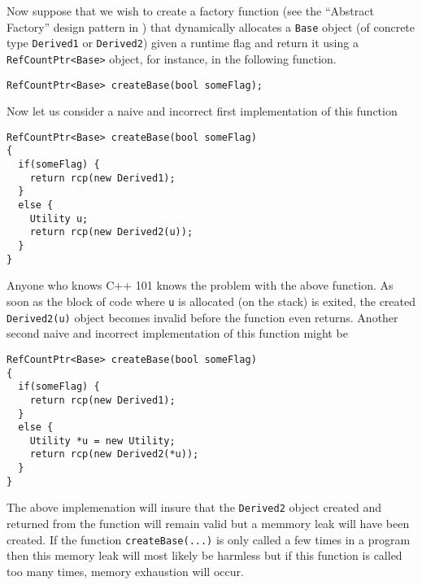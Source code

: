 Now suppose that we wish to create a factory function (see the
``Abstract Factory'' design pattern in {}\cite{ref:gama_et_al_1995})
that dynamically allocates a {}\texttt{Base} object (of concrete type
{}\texttt{Derived1} or {}\texttt{Derived2}) given a runtime flag and
return it using a {}\texttt{RefCountPtr<Base>} object, for instance,
in the following function.
%
{\scriptsize\begin{verbatim}
RefCountPtr<Base> createBase(bool someFlag);
\end{verbatim}}
%
Now let us consider a naive and incorrect first implementation of this
function
%
{\scriptsize\begin{verbatim}
RefCountPtr<Base> createBase(bool someFlag)
{
  if(someFlag) {
    return rcp(new Derived1);
  }
  else {
    Utility u;
    return rcp(new Derived2(u));
  }
}
\end{verbatim}}
%
\noindent{}
Anyone who knows C++ 101 knows the problem with the above function.
As soon as the block of code where {}\texttt{u} is allocated (on the
stack) is exited, the created {}\texttt{Derived2(u)} object becomes
invalid before the function even returns.  Another second naive and
incorrect implementation of this function might be
%
{\scriptsize\begin{verbatim}
RefCountPtr<Base> createBase(bool someFlag)
{
  if(someFlag) {
    return rcp(new Derived1);
  }
  else {
    Utility *u = new Utility;
    return rcp(new Derived2(*u));
  }
}
\end{verbatim}}
%
\noindent{}
The above implemenation will insure that the {}\texttt{Derived2} object
created and returned from the function will remain valid but a memmory
leak will have been created.  If the function {}\texttt{create\-Base(...)}
is only called a few times in a program then this memory leak will
most likely be harmless but if this function is called too many times,
memory exhaustion will occur.

